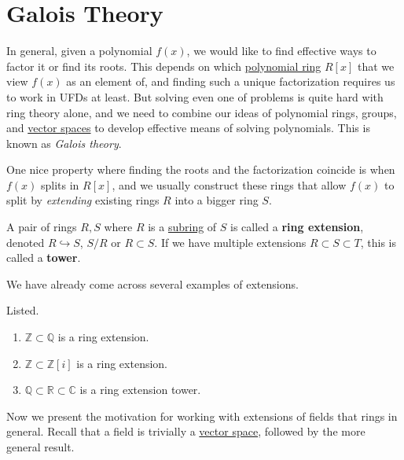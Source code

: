\section{Galois Theory}

  In general, given a polynomial $f(x)$, we would like to find effective ways to factor it or find its roots. This depends on which \hyperref[def:polynomial-ring]{polynomial ring} $R[x]$ that we view $f(x)$ as an element of, and finding such a unique factorization requires us to work in UFDs at least. But solving even one of problems is quite hard with ring theory alone, and we need to combine our ideas of polynomial rings, groups, and \hyperref[def:vector-space]{vector spaces} to develop effective means of solving polynomials. This is known as \textit{Galois theory}. 

  One nice property where finding the roots and the factorization coincide is when $f(x)$ splits in $R[x]$, and we usually construct these rings that allow $f(x)$ to split by \textit{extending} existing rings $R$ into a bigger ring $S$. 

  \begin{definition}
    \label{def:ring-extension}
    A pair of rings $R, S$ where $R$ is a \hyperref[def:subring]{subring} of $S$ is called a \textbf{ring extension}, denoted $R \hookrightarrow S$, $S/R$ or $R \subset S$. If we have multiple extensions $R \subset S \subset T$, this is called a \textbf{tower}. 
  \end{definition}

  We have already come across several examples of extensions. 

  \begin{example}
    \label{ex:ring-extensions}
    Listed.
    \begin{enumerate}
      \item $\mathbb{Z} \subset \mathbb{Q}$ is a ring extension.
      \item $\mathbb{Z} \subset \mathbb{Z}[i]$ is a ring extension. 
      \item $\mathbb{Q} \subset \mathbb{R} \subset \mathbb{C}$ is a ring extension tower. 
    \end{enumerate}
  \end{example}

  Now we present the motivation for working with extensions of fields that rings in general. Recall that a field is trivially a \hyperref[def:vector-space]{vector space}, followed by the more general result. 

